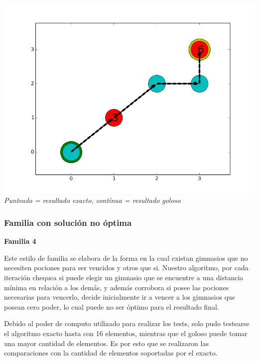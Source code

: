 \vspace*{0.3cm} \vspace*{0.3cm}
  \begin{center}
\includegraphics[scale=0.30]{./EJ2/optima.jpeg}
\\{\textit{Punteado = resultado exacto, contínua = resultado goloso}}
  \end{center}
  \vspace*{0.3cm}

\subsubsection*{Familia con soluci\'on no \'optima}

\begin{center}
\textbf{Familia 4}
\end{center}

Este estilo de familia se elabora de la forma en la cual existan gimnasios que no necesiten pociones para ser vencidos y otros que si. Nuestro algoritmo, por cada iteraci\'on chequea si puede elegir un gimnasio que se encuentre a una distancia m\'inima en relaci\'on a los demás, y adem\'as corrobora si posee las pociones necesarias para vencerlo, decide inicialmente ir a vencer a los gimnasios que posean cero poder, lo cual puede no ser \'optimo para el resultado final.

Debido al poder de computo utilizado para realizar los tests, solo pudo testearse el algoritmo exacto hasta con 16 elementos, mientras que el goloso puede tomar una mayor cantidad de elementos. Es por esto que se realizaron las comparaciones con la cantidad de elementos soportadas por el exacto.

